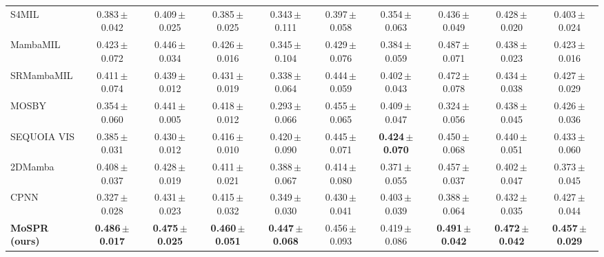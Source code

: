 \begin{tabular}{lccccccccc}
S4MIL & 0.383\,{\tiny$\pm$0.042} & 0.409\,{\tiny$\pm$0.025} & 0.385\,{\tiny$\pm$0.025} & 0.343\,{\tiny$\pm$0.111} & 0.397\,{\tiny$\pm$0.058} & 0.354\,{\tiny$\pm$0.063} & 0.436\,{\tiny$\pm$0.049} & 0.428\,{\tiny$\pm$0.020} & 0.403\,{\tiny$\pm$0.024}\\
MambaMIL & 0.423\,{\tiny$\pm$0.072} & 0.446\,{\tiny$\pm$0.034} & 0.426\,{\tiny$\pm$0.016} & 0.345\,{\tiny$\pm$0.104} & 0.429\,{\tiny$\pm$0.076} & 0.384\,{\tiny$\pm$0.059} & 0.487\,{\tiny$\pm$0.071} & 0.438\,{\tiny$\pm$0.023} & 0.423\,{\tiny$\pm$0.016}\\
SRMambaMIL & 0.411\,{\tiny$\pm$0.074} & 0.439\,{\tiny$\pm$0.012} & 0.431\,{\tiny$\pm$0.019} & 0.338\,{\tiny$\pm$0.064} & 0.444\,{\tiny$\pm$0.059} & 0.402\,{\tiny$\pm$0.043} & 0.472\,{\tiny$\pm$0.078} & 0.434\,{\tiny$\pm$0.038} & 0.427\,{\tiny$\pm$0.029}\\
MOSBY & 0.354\,{\tiny$\pm$0.060} & 0.441\,{\tiny$\pm$0.005} & 0.418\,{\tiny$\pm$0.012} & 0.293\,{\tiny$\pm$0.066} & 0.455\,{\tiny$\pm$0.065} & 0.409\,{\tiny$\pm$0.047} & 0.324\,{\tiny$\pm$0.056} & 0.438\,{\tiny$\pm$0.045} & 0.426\,{\tiny$\pm$0.036}\\
SEQUOIA VIS & 0.385\,{\tiny$\pm$0.031} & 0.430\,{\tiny$\pm$0.012} & 0.416\,{\tiny$\pm$0.010} & 0.420\,{\tiny$\pm$0.090} & 0.445\,{\tiny$\pm$0.071} & \textbf{0.424\,{\tiny$\pm$0.070}} & 0.450\,{\tiny$\pm$0.068} & 0.440\,{\tiny$\pm$0.051} & 0.433\,{\tiny$\pm$0.060}\\
2DMamba & 0.408\,{\tiny$\pm$0.037} & 0.428\,{\tiny$\pm$0.019} & 0.411\,{\tiny$\pm$0.021} & 0.388\,{\tiny$\pm$0.067} & 0.414\,{\tiny$\pm$0.080} & 0.371\,{\tiny$\pm$0.055} & 0.457\,{\tiny$\pm$0.037} & 0.402\,{\tiny$\pm$0.047} & 0.373\,{\tiny$\pm$0.045}\\
CPNN & 0.327\,{\tiny$\pm$0.028} & 0.431\,{\tiny$\pm$0.023} & 0.415\,{\tiny$\pm$0.032} & 0.349\,{\tiny$\pm$0.030} & 0.430\,{\tiny$\pm$0.041} & 0.403\,{\tiny$\pm$0.039} & 0.388\,{\tiny$\pm$0.064} & 0.432\,{\tiny$\pm$0.035} & 0.427\,{\tiny$\pm$0.044}\\
\textbf{MoSPR (ours)} & \textbf{0.486\,{\tiny$\pm$0.017}} & \textbf{0.475\,{\tiny$\pm$0.025}} & \textbf{0.460\,{\tiny$\pm$0.051}} & \textbf{0.447\,{\tiny$\pm$0.068}} & 0.456\,{\tiny$\pm$0.093} & 0.419\,{\tiny$\pm$0.086} & \textbf{0.491\,{\tiny$\pm$0.042}} & \textbf{0.472\,{\tiny$\pm$0.042}} & \textbf{0.457\,{\tiny$\pm$0.029}}\\
\bottomrule
\end{tabular}
